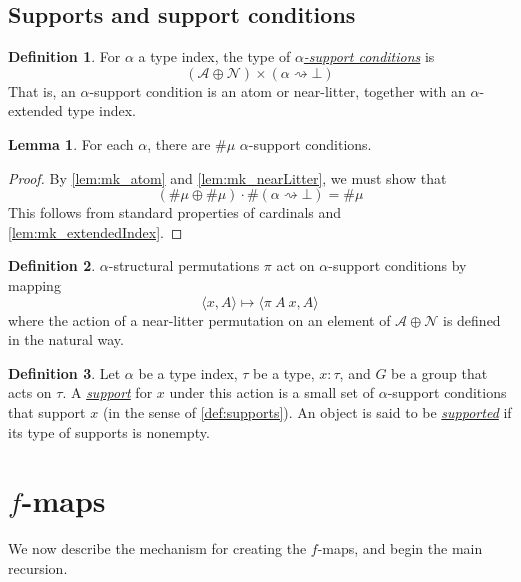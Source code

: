 \documentclass{article}
\newcommand{\cdef}[3]{\href{https://leanprover-community.github.io/con-nf/doc/ConNF/#1.html\#ConNF.#2}{\emph{#3}}}
\theoremstyle{definition}
\newtheorem{definition}{Definition}[section]
\newtheorem{lemma}[theorem]{Lemma}
\theoremstyle{remark}
\begin{document}
\subsection{Supports and support conditions}

\begin{definition}
    For \( \alpha \) a type index, the type of \cdef{Structural/Support}{SupportCondition}{\( \alpha \)-support conditions} is
    \[ (\mathcal A \oplus \mathcal N) \times (\alpha \rightsquigarrow \bot) \]
    That is, an \( \alpha \)-support condition is an atom or near-litter, together with an \( \alpha \)-extended type index.
\end{definition}
\begin{lemma}
    \label{lem:mk_supportCondition}
    For each \( \alpha \), there are \( \#\mu \) \( \alpha \)-support conditions.
\end{lemma}
\begin{proof}
    By \cref{lem:mk_atom} and \cref{lem:mk_nearLitter}, we must show that
    \[ (\#\mu \oplus \#\mu) \cdot \#(\alpha \rightsquigarrow \bot) = \#\mu \]
    This follows from standard properties of cardinals and \cref{lem:mk_extendedIndex}.
\end{proof}
\begin{definition}
    \( \alpha \)-structural permutations \( \pi \) act on \( \alpha \)-support conditions by mapping
    \[ \langle x, A \rangle \mapsto \langle \pi\ A\ x, A \rangle \]
    where the action of a near-litter permutation on an element of \( \mathcal A \oplus \mathcal N \) is defined in the natural way.
\end{definition}
\begin{definition}
    Let \( \alpha \) be a type index, \( \tau \) be a type, \( x : \tau \), and \( G \) be a group that acts on \( \tau \).
    A \cdef{Structural/Support}{Support}{support} for \( x \) under this action is a small set of \( \alpha \)-support conditions that support \( x \) (in the sense of \cref{def:supports}).
    An object is said to be \cdef{Structural/Support}{Supported}{supported} if its type of supports is nonempty.
\end{definition}

\section{\texorpdfstring{\( f \)}{f}-maps}

We now describe the mechanism for creating the \( f \)-maps, and begin the main recursion.
\end{document}
